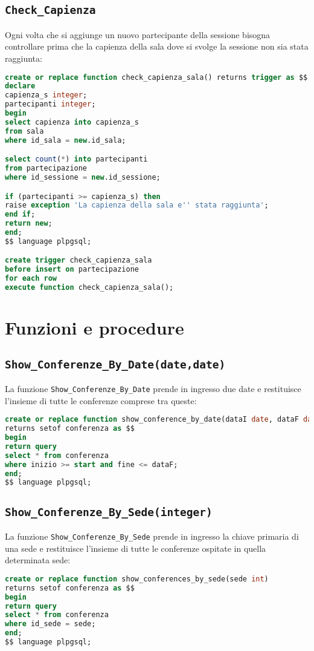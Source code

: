 \subsection{\texttt{Check\_Capienza}}
Ogni volta che si aggiunge un nuovo partecipante della sessione bisogna controllare prima che la capienza della sala dove si svolge la sessione non sia stata raggiunta:
\begin{lstlisting}[language=SQL, style=mystyle]
create or replace function check_capienza_sala() returns trigger as $$
declare
capienza_s integer;
partecipanti integer;
begin
select capienza into capienza_s
from sala
where id_sala = new.id_sala;

select count(*) into partecipanti
from partecipazione
where id_sessione = new.id_sessione;

if (partecipanti >= capienza_s) then
raise exception 'La capienza della sala e'' stata raggiunta';
end if;
return new;
end;
$$ language plpgsql;

create trigger check_capienza_sala
before insert on partecipazione
for each row
execute function check_capienza_sala();
\end{lstlisting}
\section{Funzioni e procedure}
\subsection{\texttt{Show\_Conferenze\_By\_Date(date,date)}}
La funzione \texttt{Show\_Conferenze\_By\_Date} prende in ingresso due date e restituisce l'insieme di tutte le conferenze comprese tra queste:
\begin{lstlisting}[language=SQL, style=mystyle]
create or replace function show_conference_by_date(dataI date, dataF date)
returns setof conferenza as $$
begin
return query
select * from conferenza
where inizio >= start and fine <= dataF;
end;
$$ language plpgsql;
\end{lstlisting}
\subsection{\texttt{Show\_Conferenze\_By\_Sede(integer)}}
La funzione \texttt{Show\_Conferenze\_By\_Sede} prende in ingresso la chiave primaria di una sede e restituisce l'insieme di tutte le conferenze ospitate in quella determinata sede:
\begin{lstlisting}[language=SQL, style=mystyle]
create or replace function show_conferences_by_sede(sede int)
returns setof conferenza as $$
begin
return query
select * from conferenza
where id_sede = sede;
end;
$$ language plpgsql;
\end{lstlisting}
